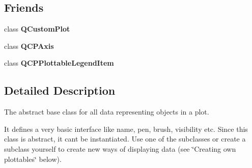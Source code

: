 \subsection*{Friends}
\begin{DoxyCompactItemize}
\item 
\mbox{\label{class_q_c_p_abstract_plottable_a1cdf9df76adcfae45261690aa0ca2198}} 
class {\bfseries Q\+Custom\+Plot}
\item 
\mbox{\label{class_q_c_p_abstract_plottable_af123edeca169ec7a31958a1d714e1a8a}} 
class {\bfseries Q\+C\+P\+Axis}
\item 
\mbox{\label{class_q_c_p_abstract_plottable_a104c78e91302afd6842a903e472f552f}} 
class {\bfseries Q\+C\+P\+Plottable\+Legend\+Item}
\end{DoxyCompactItemize}


\subsection{Detailed Description}
The abstract base class for all data representing objects in a plot. 

It defines a very basic interface like name, pen, brush, visibility etc. Since this class is abstract, it can\textquotesingle{}t be instantiated. Use one of the subclasses or create a subclass yourself to create new ways of displaying data (see \char`\"{}\+Creating own plottables\char`\"{} below).

